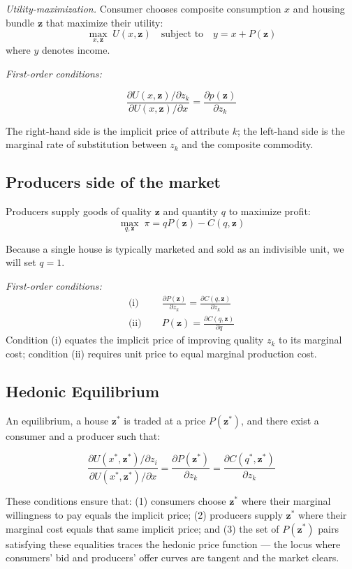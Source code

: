 \textit{Utility-maximization.}  
Consumer chooses composite consumption $x$ and housing bundle $\mathbf z$ that maximize their utility:  
\[
\max_{x,\mathbf z}\;U(x,\mathbf z)
\quad\text{subject to}\quad
y=x+P(\mathbf z)
\]
\noindent where $y$ denotes income.

\textit{First-order conditions:}  

\[ \frac{\partial U(x,\mathbf z) / \partial z_k}{\partial U (x,\mathbf z)/ \partial x} =  
\frac{\partial p(\mathbf{z})}{\partial z_k} \]

\noindent The right-hand side is the implicit price of attribute $k$; the left-hand side is the marginal rate of substitution between $z_{k}$ and the composite commodity.

\subsection*{Producers side of the market}

Producers supply goods of quality $\mathbf z$ and quantity $q$ to maximize profit:
\[
\max_{q,\mathbf z}\;\pi=qP(\mathbf z)-C(q,\mathbf z)
\]

\noindent Because a single house is typically marketed and sold as an indivisible unit, we will set $q=1$.

\textit{First-order conditions:}
\begin{align*}
\text{(i)} \quad \;&\frac{\partial P(\mathbf z)}{\partial z_{k}}= \frac{\partial C(q,\mathbf z)}{\partial z_{k}}
\\[4pt]
\text{(ii)} \quad \;&P(\mathbf z)=\frac{\partial C(q,\mathbf z)}{\partial q}
\end{align*}
Condition (i) equates the implicit price of improving quality $z_{k}$ to its marginal cost; condition (ii) requires unit price to equal marginal production cost.

\subsection*{Hedonic Equilibrium}

An equilibrium, a house $\mathbf z^{*}$ is traded at a price $P(\mathbf z^{*})$, and there exist a consumer and a producer such that:

\[
\frac{\partial U(x^{*},\mathbf z^{*})/\partial z_{i}}{\partial U(x^{*},\mathbf z^{*})/\partial x}
=
\frac{\partial P(\mathbf z^*)}{\partial z_{k}}
=
\frac{\partial C(q^{*},\mathbf z^{*})}{\partial z_{k}}
\]

\noindent These conditions ensure that: (1) consumers choose $\mathbf z^{*}$ where their marginal willingness to pay equals the implicit price;
(2) producers supply $\mathbf z^{*}$ where their marginal cost equals that same implicit price; and (3) the set of $P(\mathbf z^*)$ pairs satisfying these equalities traces the hedonic price function --- the locus where consumers' bid and producers' offer curves are tangent and the market clears.

